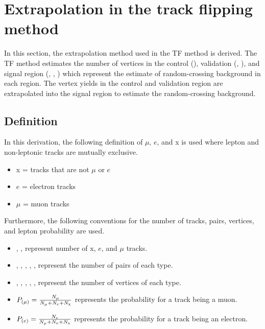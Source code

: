 \section{Extrapolation in the track flipping method}
In this section, the extrapolation method used in the TF method is derived. The TF method estimates the number of vertices in the control (\xx), validation (\mux, \ex), and signal region (\mumu, \ee, \emu) which represent the estimate of random-crossing background in each region. %
The vertex yields in the control and validation region are extrapolated into the signal region to estimate the random-crossing background.



\subsection{Definition}
In this derivation, the following definition of $\mu$, $e$, and x is used where lepton and non-leptonic tracks are mutually exclusive.
\begin{itemize}
\item x = tracks that are not $\mu$ or $e$
\item $e$ = electron tracks
\item $\mu$ = muon tracks 
\end{itemize}

Furthermore, the following conventions for the number of tracks, pairs, vertices, and lepton probability are used.
\begin{itemize}
\item \Nx, \Ne, \Nm represent number of x, $e$, and $\mu$ tracks.
\item \Nxx, \Nmx, \Nex, \Nmm, \Nee, \Nem represent the number of pairs of each type.
\item \NVxx{}, \NVmx{}, \NVex{}, \NVmm{}, \NVee{}, \NVem{} represent the number of vertices of each type.
\item $P_{(\mu)}  = \frac{N_{\mu}}{N_{\mu} + N_{e} + N_{\mathrm{x}}}$ represents the probability for a track being a muon.
\item $P_{(e)}  = \frac{N_{e}}{N_{\mu} + N_{e} + N_{\mathrm{x}}}$ represents the probability for a track being an electron.
\end{itemize}


